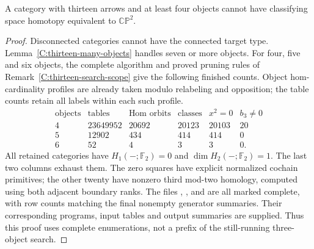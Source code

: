 \begin{proposition}\label{C:thirteen-four-plus}
A category with thirteen arrows and at least four objects cannot
have classifying space homotopy equivalent to $\mathbb{CP}^2$.
\end{proposition}
\begin{proof}
Disconnected categories cannot have the connected target type.
Lemma~\ref{C:thirteen-many-objects} handles seven or more objects.
For four, five and six objects, the complete algorithm and proved
pruning rules of Remark~\ref{C:thirteen-search-scope} give the
following finished counts. Object hom-cardinality profiles are
already taken modulo relabeling and opposition; the table counts
retain all labels within each such profile.
\[
\begin{array}{c|rrrrr}
\text{objects}&\text{tables}&\text{Hom orbits}
 &\text{classes}&x^2=0&b_3\ne0\\\hline
4&23649952&20692&20123&20103&20\\
5&12902&434&414&414&0\\
6&52&4&3&3&0.
\end{array}
\]
All retained categories have $H_1(-;\mathbb F_2)=0$ and
$\dim H_2(-;\mathbb F_2)=1$. The last two columns exhaust them.
The zero squares have explicit normalized cochain primitives;
the other twenty have nonzero third mod-two homology, computed
using both adjacent boundary ranks. The files
,
, and
are all marked complete, with row counts matching the final
nonempty generator summaries. Their corresponding programs,
input tables and output summaries are supplied. Thus this proof
uses complete enumerations, not a prefix of the still-running
three-object search.
\end{proof}
